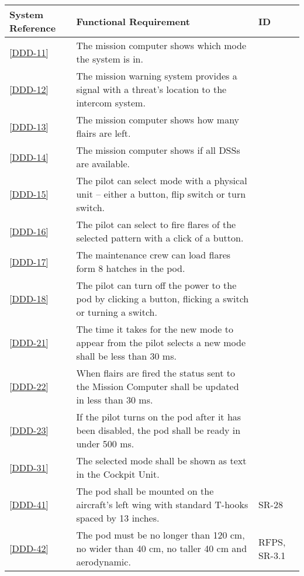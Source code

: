 \documentclass[Main]{subfiles}
\begin{document}
\begin{longtable}{l p{10.4cm} p{1.8cm} } \hline
System Reference & Functional Requirement & ID\\\hline
\ref{DDD-11} & The mission computer shows which mode the system is in. & \\

\ref{DDD-12} & The mission warning system provides a signal with a threat's location to the intercom system.& \\

\ref{DDD-13} & The mission computer shows how many flairs are left.& \\

\ref{DDD-14} & The mission computer shows if all DSSs are available.& \\

\ref{DDD-15} & The pilot can select mode with a physical unit -- either a button, flip switch or turn switch.& \\

\ref{DDD-16} & The pilot can select to fire flares of the selected pattern with a click of a button.& \\

\ref{DDD-17} & The maintenance crew can load flares form 8 hatches in the pod.& \\

\ref{DDD-18} & The pilot can turn off the power to the pod by clicking a button, flicking a switch or turning a switch.& \\

\ref{DDD-21} & The time it takes for the new mode to appear from the pilot selects a new mode shall be less than 30 ms.& \\

\ref{DDD-22} & When flairs are fired the status sent to the Mission Computer shall be updated in less than 30 ms.& \\

\ref{DDD-23} & If the pilot turns on the pod after it has been disabled, the pod shall be ready in under 500 ms.& \\

\ref{DDD-31} & The selected mode shall be shown as text in the Cockpit Unit.& \\

\ref{DDD-41} &  The pod shall be mounted on the aircraft's left wing with standard T-hooks spaced by 13 inches. & SR-28 \\

\ref{DDD-42} & The pod must be no longer than 120 cm, no wider than 40 cm, no taller 40 cm and aerodynamic. & RFPS, SR-3.1\\


\end{longtable}
\end{document}
